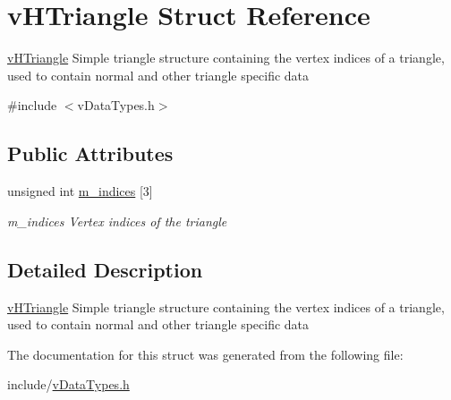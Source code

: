 \hypertarget{structvHTriangle}{\section{v\-H\-Triangle Struct Reference}
\label{structvHTriangle}
}


\hyperlink{structvHTriangle}{v\-H\-Triangle} Simple triangle structure containing the vertex indices of a triangle, used to contain normal and other triangle specific data  




{\ttfamily \#include $<$v\-Data\-Types.\-h$>$}

\subsection*{Public Attributes}
\begin{DoxyCompactItemize}
\item 
\hypertarget{structvHTriangle_a378daa3259c938a008de9b81c53436b1}{unsigned int \hyperlink{structvHTriangle_a378daa3259c938a008de9b81c53436b1}{m\-\_\-indices} \mbox{[}3\mbox{]}}\label{structvHTriangle_a378daa3259c938a008de9b81c53436b1}

\begin{DoxyCompactList}\small\item\em m\-\_\-indices Vertex indices of the triangle \end{DoxyCompactList}\end{DoxyCompactItemize}


\subsection{Detailed Description}
\hyperlink{structvHTriangle}{v\-H\-Triangle} Simple triangle structure containing the vertex indices of a triangle, used to contain normal and other triangle specific data 

The documentation for this struct was generated from the following file\-:\begin{DoxyCompactItemize}
\item 
include/\hyperlink{vDataTypes_8h}{v\-Data\-Types.\-h}\end{DoxyCompactItemize}
